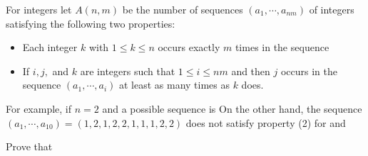 For integers  let $A(n,m)$ be the number of sequences $(a_1,\cdots,a_{nm})$ of integers satisfying the following two properties:
\begin{itemize}
	\item Each integer $k$ with $1\leq k\leq n$ occurs exactly $m$ times in the sequence 
	\item If $i,j,$ and $k$ are integers such that $1\leq i\leq nm$ and  then $j$ occurs in the sequence $(a_1,\cdots,a_i)$ at least as many times as $k$ does.
\end{itemize}

For example, if $n=2$ and  a possible sequence is   On the other hand, the sequence $(a_1,\cdots,a_{10})=(1,2,1,2,2,1,1,1,2,2)$ does not satisfy property (2) for   and 

Prove that 